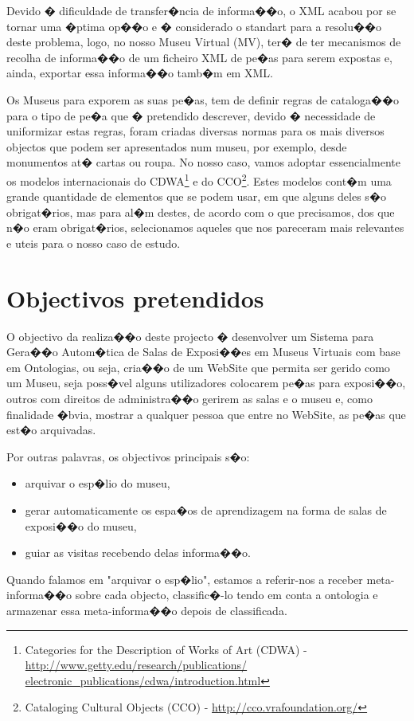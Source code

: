 \documentclass[a4paper,titlepage]{article}
\begin{document}
	Devido � dificuldade de transfer�ncia de informa��o, o XML acabou por se tornar uma �ptima op��o e � considerado o standart para a resolu��o deste problema, logo, no nosso Museu Virtual (MV), ter� de ter mecanismos de recolha de informa��o de um ficheiro XML de pe�as para serem expostas e, ainda, exportar essa informa��o tamb�m em XML.
	
	Os Museus para exporem as suas pe�as, tem de definir regras de cataloga��o para o tipo de pe�a que � pretendido descrever, devido � necessidade de uniformizar estas regras, foram criadas diversas normas para os mais diversos objectos que podem ser apresentados num museu, por exemplo, desde monumentos at� cartas ou roupa. No nosso caso, vamos adoptar essencialmente os modelos internacionais do CDWA\footnote{Categories for the Description of Works of Art (CDWA) - \url{http://www.getty.edu/research/publications/
electronic_publications/cdwa/introduction.html}} e do CCO\footnote{Cataloging Cultural Objects (CCO) - \url{http://cco.vrafoundation.org/}}. Estes modelos cont�m uma grande quantidade de elementos que se podem usar, em que alguns deles s�o obrigat�rios, mas para al�m destes, de acordo com o que precisamos, dos que n�o eram obrigat�rios, selecionamos aqueles que nos pareceram mais relevantes e uteis para o nosso caso de estudo.


\section{Objectivos pretendidos}
	O objectivo da realiza��o deste projecto � desenvolver um Sistema para Gera��o Autom�tica de Salas de Exposi��es em Museus Virtuais com base em Ontologias, ou seja, cria��o de um WebSite que permita ser gerido como um Museu, seja poss�vel alguns utilizadores colocarem pe�as para exposi��o, outros com direitos de administra��o gerirem as salas e o museu e, como finalidade �bvia, mostrar a qualquer pessoa que entre no WebSite, as pe�as que est�o arquivadas.

Por outras palavras, os objectivos principais s�o:
\begin{itemize}
	\item arquivar o esp�lio do museu,
	\item gerar automaticamente os espa�os de aprendizagem na forma de salas de exposi��o do museu,
	\item guiar as visitas recebendo delas informa��o.
\end{itemize}


	Quando falamos em "arquivar o esp�lio", estamos a referir-nos a receber meta-informa��o sobre cada objecto, classific�-lo tendo em conta a ontologia e armazenar essa meta-informa��o depois de classificada.
	
\end{document}

